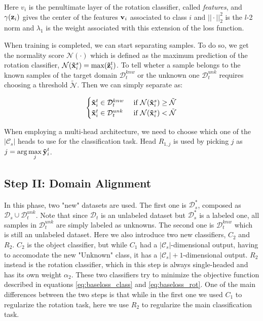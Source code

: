 \documentclass[10pt,twocolumn,letterpaper]{article}
\begin{document}
Here {\bf $v_i$} is the penultimate layer of the rotation classifier, called {\it features}, and $\gamma({\bf z}_i)$ gives the center of the features ${\bf v}_i$ associated to class $i$ and $||\cdot||_2^2$ is the $l$-2 norm and $\lambda_1$ is the weight associated with this extension of the loss function.

When training is completed, we can start separating samples.
To do so, we get the normality score $\mathcal{N}(\cdot)$ which is defined as the maximum prediction of the rotation classifier, $\mathcal{N}({\bf\tilde{x}}_i^s) = \max({\bf\tilde{z}}_i^t)$.
To tell wheter a sample belongs to the known samples of the target domain $\mathcal{D}_t^{knw}$ or the unknown one $\mathcal{D}_t^{unk}$ requires choosing a threshold $\tilde{\mathcal{N}}$.
Then we can simply separate as:

\begin{equation}
  \begin{cases}
    {\bf\tilde x}_i^t \in \mathcal{D}_t^{knw} & \text{ if } \mathcal{N}({\bf\tilde x}_i^s) \geq \tilde{\mathcal{N}} \\
    {\bf\tilde x}_i^t \in \mathcal{D}_t^{unk} & \text{ if } \mathcal{N}({\bf\tilde x}_i^s) < \tilde{\mathcal{N}}
  \end{cases}
  \label{eq:sample_separation}
\end{equation}

When employing a multi-head architecture, we need to choose which one of the $|\mathcal{C}_s|$ heads to use for the classification task.
Head $R_{1,j}$ is used by picking $j$ as $\displaystyle j = \arg\max_j {\bf\tilde{y}}_i^t$.

\subsection{Step II: Domain Alignment}
\label{sec:domain_alignment}

In this phase, two "new" datasets are used.
The first one is $\mathcal{D}_s^*$, composed as $\mathcal{D}_s \cup \mathcal{D}_t^{unk}$.
Note that since $\mathcal{D}_t$ is an unlabeled dataset but $\mathcal{D}_s^*$ is a labeled one, all samples in $\mathcal{D}_t^{unk}$ are simply labeled as unknowns.
The second one is $\mathcal{D}_t^{knw}$ which is still an unlabeled dataset.
Here we also introduce two new classifiers, $C_2$ and $R_2$.
$C_2$ is the object classifier, but while $C_1$ had a $|\mathcal{C}_s|$-dimensional output, having to accomodate the new "Unknown" class, it has a $|\mathcal{C}_s|+1$-dimensional output.
$R_2$ instead is the rotation classifier, which in this step is always single-headed and has its own weight $\alpha_2$.
These two classifiers try to minimize the objective function described in equations \ref{eq:baseloss_class} and \ref{eq:baseloss_rot}.
One of the main differences between the two steps is that while in the first one we used $C_1$ to regularize the rotation task, here we use $R_2$ to regularize the main classification task.
\end{document}
